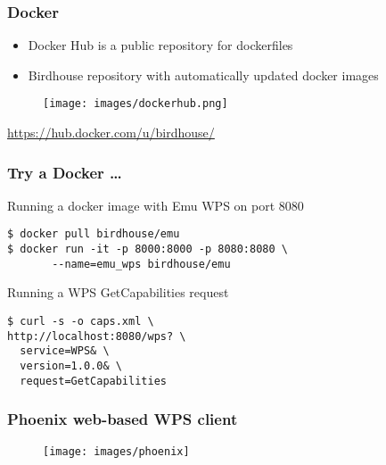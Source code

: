 \documentclass{beamer}
\begin{document}
\begin{frame}
\frametitle<presentation>{Docker}

\begin{itemize}
  \item Docker Hub is a public repository for dockerfiles
  \item Birdhouse repository with automatically updated docker images
\end{itemize}

  \begin{figure}[ht]
   \centering
   \texttt{[image: images/dockerhub.png]}
  \end{figure}

\vspace{0.2cm}
\centering
\footnotesize{\url{https://hub.docker.com/u/birdhouse/}}

\end{frame}

\begin{frame}
  \frametitle<presentation>{Try a Docker \ldots}


  Running a docker image with Emu WPS on port 8080
    \begin{verbatim}
$ docker pull birdhouse/emu
$ docker run -it -p 8000:8000 -p 8080:8080 \
       --name=emu_wps birdhouse/emu
    \end{verbatim}
  Running a WPS GetCapabilities request
    \begin{verbatim}
$ curl -s -o caps.xml \
http://localhost:8080/wps? \
  service=WPS& \
  version=1.0.0& \
  request=GetCapabilities
    \end{verbatim}
\end{frame}

\begin{frame}
  \frametitle<presentation>{Phoenix web-based WPS client}
  \begin{figure}[ht]
    \centering
    \texttt{[image: images/phoenix]}
  \end{figure}
\end{frame}
\end{document}
